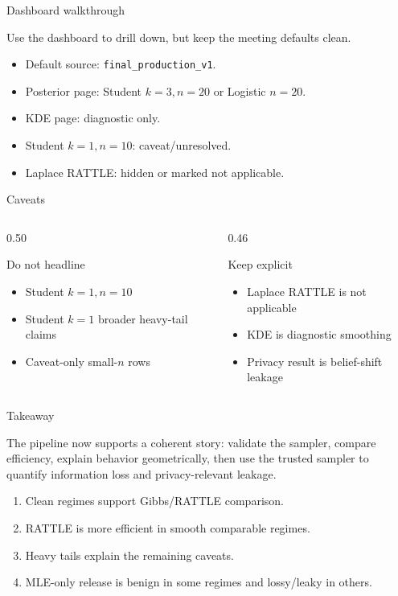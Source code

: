 \documentclass[11pt,aspectratio=169]{beamer}
\newcommand{\claim}[1]{\begin{block}{}\large #1\end{block}}
\begin{document}
\begin{frame}{Dashboard walkthrough}
  \claim{Use the dashboard to drill down, but keep the meeting defaults clean.}
  \begin{itemize}
    \item Default source: \texttt{final\_production\_v1}.
    \item Posterior page: Student $k=3,n=20$ or Logistic $n=20$.
    \item KDE page: diagnostic only.
    \item Student $k=1,n=10$: caveat/unresolved.
    \item Laplace RATTLE: hidden or marked not applicable.
  \end{itemize}
\end{frame}

\begin{frame}{Caveats}
  \begin{columns}[T,onlytextwidth]
    \begin{column}{0.50\textwidth}
      \begin{block}{Do not headline}
        \begin{itemize}
          \item Student $k=1,n=10$
          \item Student $k=1$ broader heavy-tail claims
          \item Caveat-only small-$n$ rows
        \end{itemize}
      \end{block}
    \end{column}
    \begin{column}{0.46\textwidth}
      \begin{block}{Keep explicit}
        \begin{itemize}
          \item Laplace RATTLE is not applicable
          \item KDE is diagnostic smoothing
          \item Privacy result is belief-shift leakage
        \end{itemize}
      \end{block}
    \end{column}
  \end{columns}
\end{frame}

\begin{frame}{Takeaway}
  \claim{The pipeline now supports a coherent story: validate the sampler, compare efficiency, explain behavior geometrically, then use the trusted sampler to quantify information loss and privacy-relevant leakage.}
  \begin{enumerate}
    \item Clean regimes support Gibbs/RATTLE comparison.
    \item RATTLE is more efficient in smooth comparable regimes.
    \item Heavy tails explain the remaining caveats.
    \item MLE-only release is benign in some regimes and lossy/leaky in others.
  \end{enumerate}
\end{frame}
\end{document}
